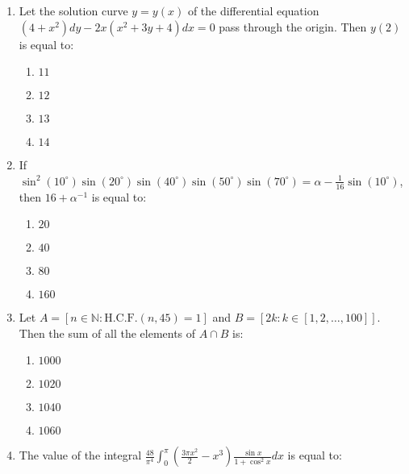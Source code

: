 \documentclass[journal]{IEEEtran}
\newcommand{\brak}[1]{\left( #1 \right)}
\newcommand{\sbrak}[1]{\left[ #1 \right]}
\begin{document}
\begin{enumerate}
    \item Let the solution curve $y=y\brak{x}$ of the differential equation $\brak{4+x^{2}}dy-2x\brak{x^{2}+3y+4}dx=0$ pass through the origin. Then $y\brak{2}$ is equal to:

        \begin{multicols}{4}
        \begin{enumerate}
        \item $11$
        \item $12$
        \item $13$
        \item $14$
        \end{enumerate}
        \end{multicols}

    \item If $\sin^{2}\brak{10^{\circ}}\sin\brak{20^{\circ}}\sin\brak{40^{\circ}}\sin\brak{50^{\circ}}\sin\brak{70^{\circ}}=\alpha-\frac{1}{16}\sin\brak{10^{\circ}}$, then $16+\alpha^{-1}$ is equal to:

        \begin{multicols}{4}
        \begin{enumerate}
        \item $20$
        \item $40$
        \item $80$
        \item $160$
        \end{enumerate}
        \end{multicols}

    \item Let $A=\sbrak{n\in\mathbb{N}:\text{H.C.F.}\brak{n,45}=1}$ and $B=\sbrak{2k:k\in\sbrak{1,2,\ldots,100}}$. Then the sum of all the elements of $A\cap B$ is:

        \begin{multicols}{4}
        \begin{enumerate}
        \item $1000$
        \item $1020$
        \item $1040$
        \item $1060$
        \end{enumerate}
        \end{multicols}

    \item The value of the integral $\frac{48}{\pi^{4}}\int_{0}^{\pi}\brak{\frac{3\pi x^{2}}{2}-x^{3}}\frac{\sin x}{1+\cos^{2}x}dx$ is equal to:
    

\end{enumerate}
\end{document}
